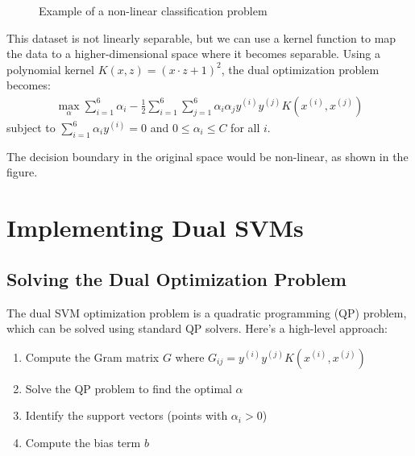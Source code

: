 \documentclass{article}
\begin{document}
\begin{figure}[h]
\centering
{}
\caption{Example of a non-linear classification problem}
\end{figure}

This dataset is not linearly separable, but we can use a kernel function to map the data to a higher-dimensional space where it becomes separable. Using a polynomial kernel $K(x, z) = (x \cdot z + 1)^2$, the dual optimization problem becomes:
\begin{align}
\max_{\alpha} \sum_{i=1}^{6} \alpha_i - \frac{1}{2} \sum_{i=1}^{6} \sum_{j=1}^{6} \alpha_i \alpha_j y^{(i)} y^{(j)} K(x^{(i)}, x^{(j)})
\end{align}
subject to $\sum_{i=1}^{6} \alpha_i y^{(i)} = 0$ and $0 \leq \alpha_i \leq C$ for all $i$.

The decision boundary in the original space would be non-linear, as shown in the figure.

\section{Implementing Dual SVMs}

\subsection{Solving the Dual Optimization Problem}
The dual SVM optimization problem is a quadratic programming (QP) problem, which can be solved using standard QP solvers. Here's a high-level approach:

\begin{enumerate}
    \item Compute the Gram matrix $G$ where $G_{ij} = y^{(i)} y^{(j)} K(x^{(i)}, x^{(j)})$
    \item Solve the QP problem to find the optimal $\alpha$
    \item Identify the support vectors (points with $\alpha_i > 0$)
    \item Compute the bias term $b$
\end{enumerate}
\end{document}
